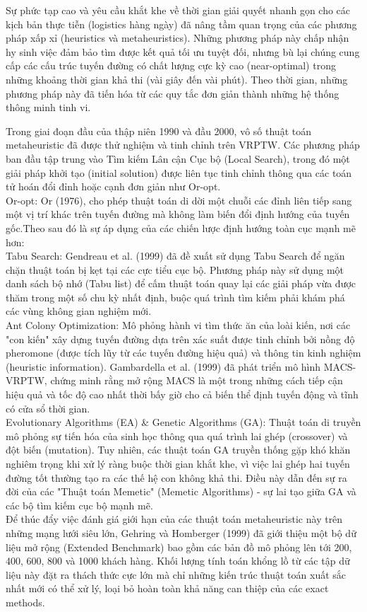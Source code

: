 \documentclass[13pt, a4paper]{extarticle} %
\begin{document}
Sự phức tạp cao và yêu cầu khắt khe về thời gian giải quyết nhanh gọn cho các kịch bản thực tiễn (logistics hàng ngày) đã nâng tầm quan trọng của các phương pháp xấp xỉ (heuristics và metaheuristics). Những phương pháp này chấp nhận hy sinh việc đảm bảo tìm được kết quả tối ưu tuyệt đối, nhưng bù lại chúng cung cấp các cấu trúc tuyến đường có chất lượng cực kỳ cao (near-optimal) trong những khoảng thời gian khả thi (vài giây đến vài phút). Theo thời gian, những phương pháp này đã tiến hóa từ các quy tắc đơn giản thành những hệ thống thông minh tinh vi.\vspace{0.5cm}

Trong giai đoạn đầu của thập niên 1990 và đầu 2000, vô số thuật toán metaheuristic đã được thử nghiệm và tinh chỉnh trên VRPTW. Các phương pháp ban đầu tập trung vào Tìm kiếm Lân cận Cục bộ (Local Search), trong đó một giải pháp khởi tạo (initial solution) được liên tục tinh chỉnh thông qua các toán tử hoán đổi đỉnh hoặc cạnh đơn giản như Or-opt.\\
Or-opt: Or (1976), cho phép thuật toán di dời một chuỗi các đỉnh liên tiếp sang một vị trí khác trên tuyến đường mà không làm biến đổi định hướng của tuyến gốc.Theo sau đó là sự áp dụng của các chiến lược định hướng toàn cục mạnh mẽ hơn:\\
Tabu Search: Gendreau et al. (1999) đã đề xuất sử dụng Tabu Search để ngăn chặn thuật toán bị kẹt tại các cực tiểu cục bộ. Phương pháp này sử dụng một danh sách bộ nhớ (Tabu list) để cấm thuật toán quay lại các giải pháp vừa được thăm trong một số chu kỳ nhất định, buộc quá trình tìm kiếm phải khám phá các vùng không gian nghiệm mới.\\
Ant Colony Optimization: Mô phỏng hành vi tìm thức ăn của loài kiến, nơi các "con kiến" xây dựng tuyến đường dựa trên xác suất được tinh chỉnh bởi nồng độ pheromone (được tích lũy từ các tuyến đường hiệu quả) và thông tin kinh nghiệm (heuristic information). Gambardella et al. (1999) đã phát triển mô hình MACS-VRPTW, chứng minh rằng mở rộng MACS là một trong những cách tiếp cận hiệu quả và tốc độ cao nhất thời bấy giờ cho cả biến thể định tuyến động và tĩnh có cửa sổ thời gian.\\

Evolutionary Algorithms (EA) \& Genetic Algorithms (GA): Thuật toán di truyền mô phỏng sự tiến hóa của sinh học thông qua quá trình lai ghép (crossover) và đột biến (mutation). Tuy nhiên, các thuật toán GA truyền thống gặp khó khăn nghiêm trọng khi xử lý ràng buộc thời gian khắt khe, vì việc lai ghép hai tuyến đường tốt thường tạo ra các thế hệ con không khả thi. Điều này dẫn đến sự ra đời của các "Thuật toán Memetic" (Memetic Algorithms) - sự lai tạo giữa GA và các bộ tìm kiếm cục bộ mạnh mẽ.\\
Để thúc đẩy việc đánh giá giới hạn của các thuật toán metaheuristic này trên những mạng lưới siêu lớn, Gehring và Homberger (1999) đã giới thiệu một bộ dữ liệu mở rộng (Extended Benchmark) bao gồm các bản đồ mô phỏng lên tới 200, 400, 600, 800 và 1000 khách hàng. Khối lượng tính toán khổng lồ từ các tập dữ liệu này đặt ra thách thức cực lớn mà chỉ những kiến trúc thuật toán xuất sắc nhất mới có thể xử lý, loại bỏ hoàn toàn khả năng can thiệp của các exact methods.\vspace{0.5cm}
\end{document}
